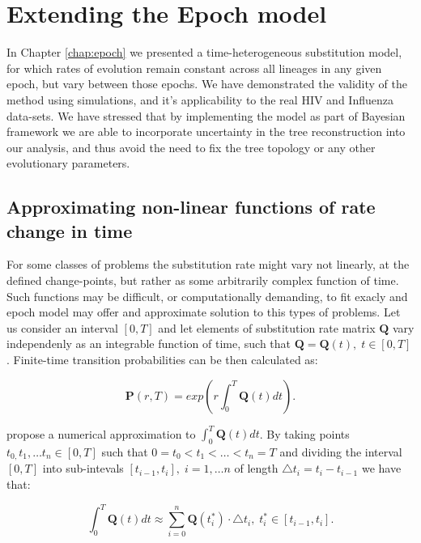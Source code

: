 \section{Extending the Epoch model}

In Chapter \ref{chap:epoch} we presented a time-heterogeneous substitution model, for which rates of evolution remain constant across all lineages in any given epoch, but vary between those epochs.
We have demonstrated the validity of the method using simulations, and it's applicability to the real HIV and Influenza data-sets.
We have stressed that by implementing the model as part of Bayesian framework we are able to incorporate uncertainty in the tree reconstruction into our analysis, and thus avoid the need to fix the tree topology or any other evolutionary parameters.

\subsection{Approximating non-linear functions of rate change in time\label{sub:nonlinear}}

For some classes of problems the substitution rate might vary not linearly, at the defined change-points, but rather as some arbitrarily complex function of time. 
Such functions may be difficult, or computationally demanding, to fit exacly and epoch model may offer and approximate solution to this types of problems.
Let us consider an interval $\left[0,T\right]$ and let elements of substitution rate matrix $\mathbf{Q}$ vary independenly as an integrable function of time, such that $\mathbf{Q}=\mathbf{Q}(t),\; t\in\left[0,T\right]$. 
Finite-time transition probabilities can be then calculated as: 

\begin{equation}
\ensuremath{\mathbf{P}}(r,T)=exp\left(r\int_{0}^{T}\mathbf{Q}(t)dt\right).\label{eq:rodrigo}
\end{equation}

\noindent
\citet{Rodrigo2008} propose a numerical approximation to $\int_{0}^{T}\mathbf{Q}(t)dt$. 
By taking points $t_{0,}t_{1},\ldots t_{n}\in[0,T]$ such that $0=t_{0}<t_{1}<\ldots<t_{n}=T$ and dividing the interval $\left[0,T\right]$ into sub-intevals $\left[t_{i-1},t_{i}\right],\; i=1,\ldots n$ of length $\triangle t_{i}=t_{i}-t_{i-1}$ we have that:   

\begin{equation}
\int_{0}^{T}\mathbf{Q}(t)dt\approx\underset{i=0}{\overset{n}{\sum}}\mathbf{Q}(t_{i}^{*})\cdot\triangle t_{i},\; t_{i}^{*}\in[t_{i-1},t_{i}].\label{eq:approx}
\end{equation}

